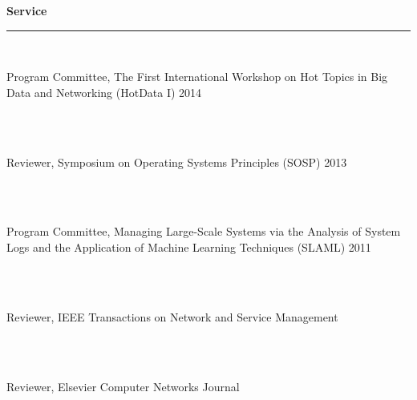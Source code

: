 \documentclass[11pt]{article}
\newcommand{\pagewidth}{6.8 in}
\newcommand{\tabwidth}{1.5 in}
\newcommand{\head}[1]{
{\bf #1} \\
\rule{\textwidth}{0.01 in}

\vspace{-0.35 in}

}
\begin{document}

\head{Service}

\begin{tabbing}
\hspace{\tabwidth} \= \\
\parbox[t]{\pagewidth}{Program Committee, The First International Workshop on Hot Topics in Big Data and Networking (HotData I) 2014}\\ \\
\parbox[t]{\pagewidth}{Reviewer, Symposium on Operating Systems Principles (SOSP) 2013}\\ \\
\parbox[t]{\pagewidth}{Program Committee, Managing Large-Scale Systems via the Analysis of System Logs and the Application of Machine Learning Techniques (SLAML) 2011}\\ \\
\parbox[t]{\pagewidth}{Reviewer, IEEE Transactions on Network and Service Management}\\ \\
\parbox[t]{\pagewidth}{Reviewer, Elsevier Computer Networks Journal}

\end{tabbing}
\end{document}
